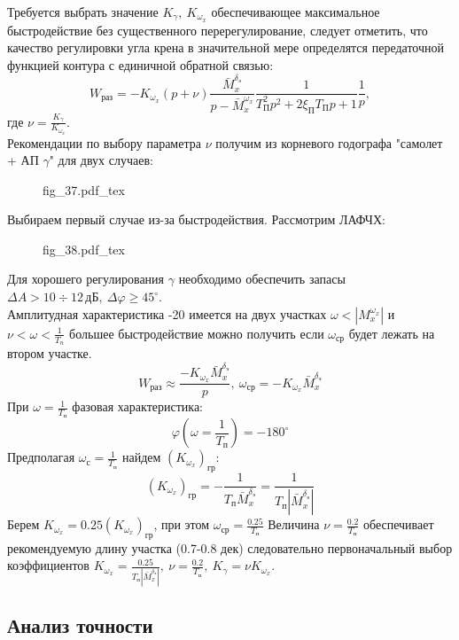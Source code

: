 \documentclass{article}
\begin{document}
Требуется выбрать значение $K_\gamma, \ K_{\omega_x}$ обеспечивающее
максимальное быстродействие без существенного перерегулирование, следует
отметить, что качество регулировки угла крена в значительной мере определятся
передаточной функцией контура с единичной обратной связью:
\[
	W_\text{раз} = -K_{\omega_x} (p + \nu)\frac{\bar{M}_x^{\delta_\text{э}}}{p
	-\bar{M}_x^{\omega_x}}\frac{1}{T_\text{П}^2 p^2 + 2 \xi_\text{П} T_\text{П}
		p + 1}\frac{1}{p},
\]
где $\nu = \frac{K_\gamma}{K_{\omega_x}}$.\\
Рекомендации по выбору параметра $\nu$ получим из корневого годографа "самолет
+ АП $\gamma$" для двух случаев:

\begin{figure}[H]
	\centering
	{fig_37.pdf_tex}
\end{figure}
Выбираем первый случае из-за быстродействия.
Рассмотрим ЛАФЧХ:
\begin{figure}[H]
	\centering
	{fig_38.pdf_tex}
\end{figure}

Для хорошего регулирования $\gamma$ необходимо обеспечить запасы $\Delta A > 10
	\div 12 \, \text{дБ},\ \Delta \varphi \geq 45^\circ$.\\
Амплитудная характеристика -20 имеется на двух участках $\omega <
	|M_x^{\omega_x}|$ и $\nu < \omega <\frac{1}{T_n}$ большее быстродействие можно
получить если $\omega_\text{ср}$ будет лежать на втором участке.
\[
	W_\text{раз} \approx \frac{-K_{\omega_x} \bar{M}_x^{\delta_\text{э}}}{p},\
	\omega_\text{ср} = -K_{\omega_x} \bar{M}_x^{\delta_\text{э}}
\]
При $\omega = \frac{1}{T_\text{п}}$ фазовая характеристика:
\[
	\varphi(\omega=\frac{1}{T_\text{п}}) = -180^\circ
\]
Предполагая $\omega_\text{с} = \frac{1}{T_\text{п}}$ найдем
$(K_{\omega_x})_\text{гр}$:
\[
	(K_{\omega_x})_\text{гр} = -\frac{1}{T_\text{п}
	\bar{M}_x^{\delta_\text{э}}} = \frac{1}{T_\text{п}
	|\bar{M}_x^{\delta_\text{э}}|}
\]
Берем $K_{\omega_x} = 0.25(K_{\omega_x})_\text{гр}$, при этом $\omega_\text{ср}
	= \frac{0.25}{T_\text{п}}$
Величина $\nu =\frac{0.2}{T_\text{п}}$ обеспечивает рекомендуемую длину участка
(0.7-0.8 дек) следовательно первоначальный выбор коэффициентов $K_{\omega_x}
	=\frac{0.25}{T_\text{п} |\bar{M}_x^{\delta_\text{э}}|}, \ \nu=
	\frac{0.2}{T_\text{п}},\ K_\gamma = \nu K_{\omega_x}$.

\subsection{Анализ точности}
\end{document}
